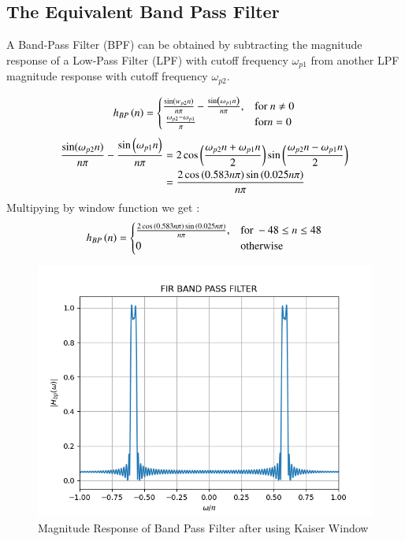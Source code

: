 \documentclass{article}
\begin{document}
\subsection{The Equivalent Band Pass Filter}
A Band-Pass Filter (BPF) can be obtained by subtracting the magnitude response of a Low-Pass Filter (LPF) with cutoff frequency $\omega_{p1}$ from another LPF magnitude response with cutoff frequency $\omega_{p2}$.

\begin{align}
    h_{BP}\left(n\right) = 
\begin{cases} 
    \frac{\sin(w_{p2} n)}{n\pi} -\frac{\sin\left(\omega_{p1}n\right)}{n\pi},  & \text{for } n\neq 0\\\
    \frac{\omega_{p2}-\omega_{p1}}{\pi} &\text{for} n= 0
\end{cases} \label{eq:h(n)desired_for_LPF}
\end{align}
\begin{align}
     \frac{\sin(\omega_{p2} n)}{n\pi} -\frac{\sin\left(\omega_{p1}n\right)}{n\pi} &= 2\cos{\ensuremath{\left(\frac{\omega_{p2}n+\omega_{p1}n}{2}\right)}}\sin{\ensuremath{\left(\frac{\omega_{p2}n-\omega_{p1}n}{2}\right)}}\\
            &= \frac{2\cos{\ensuremath{\left(0.583n\pi\right)}}\sin{\ensuremath{\left(0.025n\pi\right)}}}{n\pi}
\end{align}
Multipying by window function we get :
\begin{align}
    h_{BP}\left(n\right) = 
\begin{cases} 
   \frac{2\cos{\ensuremath{\left(0.583n\pi\right)}}\sin{\ensuremath{\left(0.025n\pi\right)}}}{n\pi},  & \text{for } -48\leq n \leq 48 \\
    0 &\text{otherwise}
\end{cases} \label{eq:h(n)desired_for_LPF}
\end{align}

\begin{figure}[H]
\centering
\includegraphics[width=1\columnwidth]{figs/FIR_Bandpass_Filter.png}
\caption{Magnitude Response of Band Pass Filter after using Kaiser Window}
\label{fig:Kaiser_BPF_response}
\end{figure}
\end{document}
